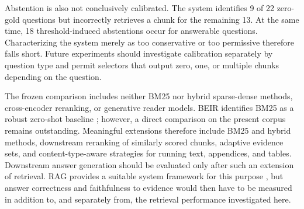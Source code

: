 \documentclass[11pt]{article}
\begin{document}
Abstention is also not conclusively calibrated. The system identifies 9 of 22 zero-gold questions but incorrectly retrieves a chunk for the remaining 13. At the same time, 18 threshold-induced abstentions occur for answerable questions. Characterizing the system merely as too conservative or too permissive therefore falls short. Future experiments should investigate calibration separately by question type and permit selectors that output zero, one, or multiple chunks depending on the question.

The frozen comparison includes neither BM25 nor hybrid sparse-dense methods, cross-encoder reranking, or generative reader models. BEIR identifies BM25 as a robust zero-shot baseline \citep{thakur2021beir}; however, a direct comparison on the present corpus remains outstanding. Meaningful extensions therefore include BM25 and hybrid methods, downstream reranking of similarly scored chunks, adaptive evidence sets, and content-type-aware strategies for running text, appendices, and tables. Downstream answer generation should be evaluated only after such an extension of retrieval. RAG provides a suitable system framework for this purpose \citep{lewis2020rag}, but answer correctness and faithfulness to evidence would then have to be measured in addition to, and separately from, the retrieval performance investigated here.


\end{document}

